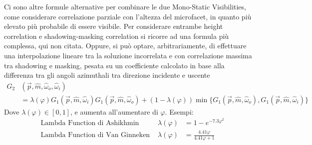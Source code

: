 Ci sono altre formule alternative per combinare le due Mono-Static Visibilities, come considerare correlazione parziale con l'altezza del microfacet,
in quanto pi\`u elevato pi\`u probabile di essere visibile. Per considerare entrambe height correlation e shadowing-masking correlation si ricorre 
ad una formula pi\`u complessa, qui non citata. Oppure, si pu\`o optare, arbitrariamente, di effettuare una interpolazione lineare tra la soluzione
incorrelata e con correlazione massima tra shadowing e masking, pesata su un coefficiente calcolato in base alla differenza tra gli angoli azimuthali
tra direzione incidente e uscente \cite{akenine-moller}
\begin{align}
	G_2&(\vec{p},\hat{m},\hat{\omega}_o,\hat{\omega}_i) \nonumber \\ 
		&=\lambda(\varphi)G_1(\vec{p},\hat{m},\hat{\omega}_i)G_1(\vec{p},\hat{m},\hat{\omega}_o)+%
		(1-\lambda(\varphi))\min\{G_1(\vec{p},\hat{m},\hat{\omega}_o),G_1(\vec{p},\hat{m},\hat{\omega}_i)\}
\end{align}
Dove $\lambda(\varphi)\in[0,1]$, e aumenta all'aumentare di $\varphi$. Esempi:
\begin{align}
	&\text{Lambda Function di Ashikhmin }&\lambda(\varphi)&=1-e^{-7.3\varphi^2} \\
	&\text{Lambda Function di Van Ginneken }&\lambda(\varphi)&=\frac{4.41\varphi}{4.41\varphi+1}
\end{align}
